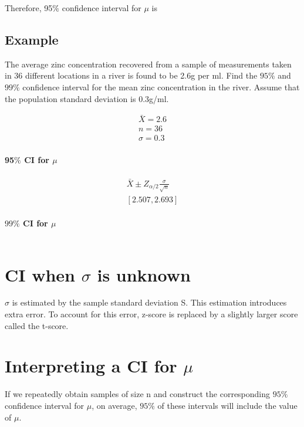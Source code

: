 \documentclass{article}
\begin{document}
    Therefore, 95$\%$ confidence interval for $\mu$ is 
    \begin{equation*}
        [\bar{X} - Z_{0.025}\frac{\sigma}{\sqrt{n}}, \bar{X} + Z_{0.025}\frac{\sigma}{\sqrt{n}}]
    \end{equation*}
    
    \subsection*{Example}
    The average zinc concentration recovered from a sample of measurements taken in 
    36 different locations in a river is found to be 2.6g per ml. Find the $95\%$ and $99\%$ confidence interval for 
    the mean zinc concentration in the river. Assume that the population standard deviation is 0.3g/ml.

    \begin{align*}
        \bar{X} = 2.6\\
        n = 36\\
        \sigma = 0.3
    \end{align*}

    \paragraph*{95$\%$ CI for $\mu$}
        \begin{align*}
            \bar{X} \pm Z_{\alpha/2} \frac{\sigma}{\sqrt{n}}\\
            [2.507, 2.693]
        \end{align*}

    \paragraph*{$99\%$ CI for $\mu$}
        \begin{equation*}
             [2.471, 2.729]
        \end{equation*}

    \section*{CI when $\sigma$ is unknown}
        $\sigma$ is estimated by the sample standard deviation S.
        This estimation introduces extra error. To account for this error,
        z-score is replaced by a slightly larger score called the t-score.

    \section*{Interpreting a CI for $\mu$}
    If we repeatedly obtain samples of size n and construct the corresponding $95\%$ 
    confidence interval for $\mu$, on average, $95\%$ of these intervals will include the value of $\mu$.
\end{document}
